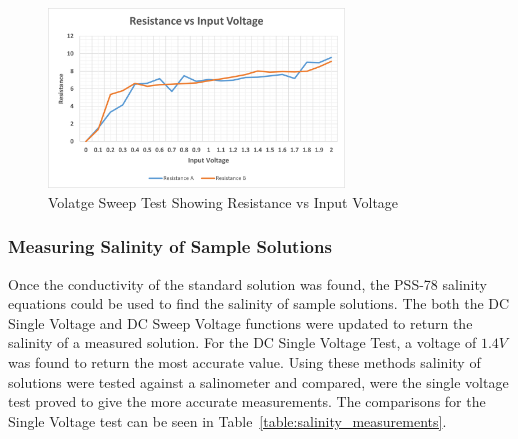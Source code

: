 \begin{figure}[H]
    \centering
    \includegraphics[width=0.7\textwidth]{figures/sal_vsweep.png}
    \caption{Volatge Sweep Test Showing Resistance vs Input Voltage}
    \label{fig:sal_vsweepdc}
\end{figure}

\subsubsection{Measuring Salinity of Sample Solutions}
Once the conductivity of the standard solution was found, the PSS-78 salinity equations could be used to find the salinity of sample solutions.
The both the DC Single Voltage and DC Sweep Voltage functions were updated to return the salinity of a measured solution.
For the DC Single Voltage Test, a voltage of $1.4V$ was found to return the most accurate value.
Using these methods salinity of solutions were tested against a salinometer and compared, were the single voltage test proved to give the more accurate measurements.
The comparisons for the Single Voltage test can be seen in Table~\ref{table:salinity_measurements}.

